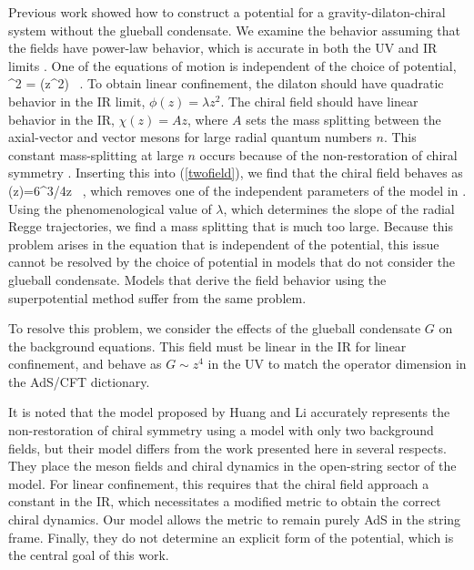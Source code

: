 Previous work showed how to construct a potential for a gravity-dilaton-chiral system without the glueball condensate. 
We examine the behavior assuming that the fields have power-law behavior, which is accurate in both the UV and IR limits \cite{Springer2010}. 
One of the equations of motion is independent of the choice of potential,
\be
\chidot^2  =  \Dz(z^2\phidot) \, . 
\label{twofield}
\ee
To obtain linear confinement, the dilaton should have quadratic behavior in the IR limit, $\phi(z)=\lambda z^2$.
The chiral field should have linear behavior in the IR, $\chi(z)=A z$, where $A$ sets the mass splitting between the axial-vector and vector mesons for large radial quantum numbers $n$. 
This constant mass-splitting at large $n$ occurs because of the non-restoration of chiral symmetry \cite{Shifman-2008}.
Inserting this into (\ref{twofield}), we find that the chiral field behaves as
\be
\chi(z)=6^{3/4}\sqrt{\lambda}z \, ,
\ee
which removes one of the independent parameters of the model in \cite{gherghetta-kelley}. 
Using the phenomenological value of $\lambda$, which determines the slope of the radial Regge trajectories, we find a mass splitting that is much too large.
Because this problem arises in the equation that is independent of the potential, this issue cannot be resolved by the choice of potential in models that do not consider the glueball condensate. 
Models that derive the field behavior using the superpotential method suffer from the same problem.

To resolve this problem, we consider the effects of the glueball condensate $G$ on the background equations. 
This field must be linear in the IR for linear confinement, and behave as $G \sim z^4$ in the UV to match the operator dimension in the AdS/CFT dictionary.

It is noted that the model proposed by Huang and Li \cite{Li2013, Li2013a} accurately represents the non-restoration of chiral symmetry using a model with only two background fields, but their model differs from the work presented here in several respects.
They place the meson fields and chiral dynamics in the open-string sector of the model. 
For linear confinement, this requires that the chiral field approach a constant in the IR, which necessitates a modified metric to obtain the correct chiral dynamics.
Our model allows the metric to remain purely AdS in the string frame.
Finally, they do not determine an explicit form of the potential, which is the central goal of this work.

